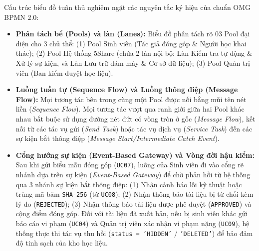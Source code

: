 Cấu trúc biểu đồ tuân thủ nghiêm ngặt các nguyên tắc ký hiệu của chuẩn OMG BPMN 2.0:
\begin{itemize}[leftmargin=*,noitemsep]
    \item \textbf{Phân tách bể (Pools) và làn (Lanes):} Biểu đồ phân tách rõ 03 Pool đại diện cho 3 chủ thể: (1) Pool Sinh viên (Tác giả đóng góp \& Người học khai thác); (2) Pool Hệ thống 5Share (chứa 2 làn nội bộ: Làn Kiểm tra tự động \& Xử lý sự kiện, và Làn Lưu trữ đám mây \& Cơ sở dữ liệu); (3) Pool Quản trị viên (Ban kiểm duyệt học liệu).
    \item \textbf{Luồng tuần tự (Sequence Flow) và Luồng thông điệp (Message Flow):} Mọi tương tác bên trong cùng một Pool được nối bằng mũi tên nét liền (\textit{Sequence Flow}). Mọi tương tác vượt qua ranh giới giữa hai Pool khác nhau bắt buộc sử dụng đường nét đứt có vòng tròn ở gốc (\textit{Message Flow}), kết nối từ các tác vụ gửi (\textit{Send Task}) hoặc tác vụ dịch vụ (\textit{Service Task}) đến các sự kiện bắt thông điệp (\textit{Message Start/Intermediate Catch Event}).
    \item \textbf{Cổng hướng sự kiện (Event-Based Gateway) và Vòng đời hậu kiểm:} Sau khi gửi biểu mẫu đóng góp (\texttt{UC07}), luồng của Sinh viên đi vào cổng rẽ nhánh dựa trên sự kiện (\textit{Event-Based Gateway}) để chờ phản hồi từ hệ thống qua 3 nhánh sự kiện bắt thông điệp: (1) Nhận cảnh báo lỗi kỹ thuật hoặc trùng mã băm \texttt{SHA-256} (từ \texttt{UC08}); (2) Nhận thông báo tài liệu bị từ chối kèm lý do (\texttt{REJECTED}); (3) Nhận thông báo tài liệu được phê duyệt (\texttt{APPROVED}) và cộng điểm đóng góp. Đối với tài liệu đã xuất bản, nếu bị sinh viên khác gửi báo cáo vi phạm (\texttt{UC04}) và Quản trị viên xác nhận vi phạm nặng (\texttt{UC09}), hệ thống thực thi tác vụ thu hồi (\texttt{status = 'HIDDEN'} / \texttt{'DELETED'}) để bảo đảm độ tinh sạch của kho học liệu.
\end{itemize}
